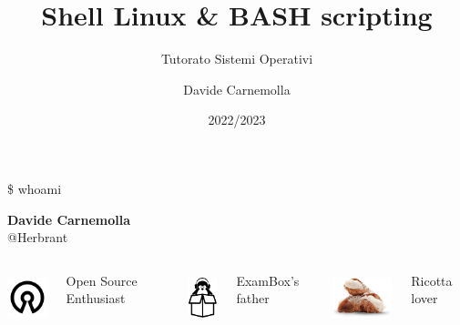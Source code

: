 \documentclass{beamer}
\title{Shell Linux \& BASH scripting}
\subtitle{Tutorato Sistemi Operativi}
\author{Davide Carnemolla}
\institute{Dipartimento di Matematica e Informatica \\ Università di Catania}
\date{2022/2023}
\begin{document}
    \begin{frame}
        \maketitle
    \end{frame}

    \begin{frame}{\$ whoami}
        \centering

        \textbf{Davide Carnemolla} \\ @Herbrant

        \vspace{1cm}

        \begin{columns}[t, onlytextwidth]
                \centering
                \includegraphics[height=1.5cm, keepaspectratio]{images/open-source.pdf}

                \small Open Source Enthusiast
               

                \centering
                \includegraphics[height=1.5cm, keepaspectratio]{images/exambox.pdf}

                \small ExamBox's father
            
                \centering
                \includegraphics[height=1.5cm, keepaspectratio]{images/cannoli.png}

                \small Ricotta lover
    
        \end{columns}        
    \end{frame}
    
\end{document}

